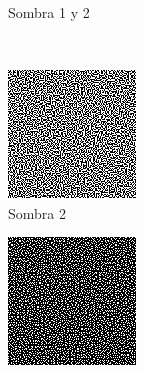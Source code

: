 \begin{figure}[Hp]
\begin{subfigure}[t]{0.3\textwidth}
		\caption{Sombra 1 y 2}
	\end{subfigure}
	\\
	\begin{subfigure}[t]{0.3\textwidth}
		\centering
		\includegraphics[width=\textwidth]{images/shade01}
		\caption{Sombra 2}
	\end{subfigure}
	\hspace{0.5cm}
	\begin{subfigure}[t]{0.3\textwidth}
		\centering
		\includegraphics[width=\textwidth]{images/shade0y2}

\end{subfigure}
\end{figure}
